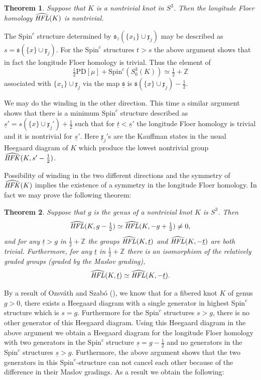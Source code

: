 \documentclass{gtart_h}
\newtheorem{thm}{Theorem}[section]
\theoremstyle{definition}
\newcommand{\ut}{\underline{t}}
\newcommand{\us}{\underline{s}}
\newcommand\relspinc{\underline{\spinc}}
\newcommand{\spinc}{\mathfrak s}
\newcommand\HFK{\text{\it HFK\/}}
\newcommand\HFL{\text{\it HFL\/}}
\newcommand{\Z}{\mathbb{Z}}
\newcommand{\SpinC}{{\mathrm{Spin}}^c}
\begin{document}
\begin{thm}
Suppose that $K$ is a nontrivial  knot in $S^3$. Then the longitude Floer homology $\widehat{\HFL}(K)$
is nontrivial.\end{thm}


The $\SpinC$ structure determined by $\spinc_z(\{x_1\}\cup \mathfrak{x}_j)$ may be described
as $s=\spinc(\{x\}\cup \mathfrak{x}_j)$. For the $\SpinC$ structures $t>s$ the above
argument shows that in fact the longitude Floer homology is trivial.
Thus the element of
$$\tfrac{1}{2}\text{PD}[\mu]+\SpinC(S^3_0(K))\simeq \tfrac{1}{2}+\Z$$
associated with $\{x_1\}\cup \mathfrak{x}_j$ via the map
$\relspinc$ is $\spinc(\{x\}\cup\mathfrak{x}_j)-\frac{1}{2}$.

We may do the winding in the other direction. This time a similar argument shows
that there is a minimum $\SpinC$ structure described as $\us'=s(\{x\}\cup\mathfrak{x}_j')+\frac{1}{2}$
such that for $\ut<\us'$ the longitude Floer homology is trivial and it is nontrivial
for $\us'$. Here $\mathfrak{x}_j'$s are the Kauffman states in the usual Heegaard
diagram of $K$ which produce the lowest nontrivial group $\widehat{\HFK}(K,s'-\frac{1}{2})$.

Possibility of winding in the two different directions and the symmetry of
$\widehat{\HFK}(K)$ implies the
existence of a symmetry in the
longitude Floer homology. In fact we may prove the following theorem:

\begin{thm}\label{thm:genusbound} Suppose that $g$ is the genus of a nontrivial knot $K$ is $S^3$. Then
$$
\widehat{\HFL}(K,g-\tfrac{1}{2})\simeq \widehat{\HFL}(K,-g+\tfrac{1}{2})\neq 0,$$
and for any $\ut>g$ in $\tfrac{1}{2}+\mathbb{Z}$ the groups
$\widehat{\HFL}(K,\ut)$ and $\widehat{\HFL}(K,-\ut)$ are both trivial. Furthermore,
for any $\ut$ in $\tfrac{1}{2}+\mathbb{Z}$ there is an isomorphism of the
relatively graded groups (graded by the Maslov grading),
$$
\widehat{\HFL}(K,\ut)\simeq \widehat{\HFL}(K,-\ut).
$$\end{thm}

By a result of Ozsv\'ath and Szab\'o (\cite{OS-fibered}), we know that for a fibered knot $K$ of genus $g>0$,
there exists a Heegaard diagram with a single generator in highest $\SpinC$ structure which is $s=g$.
Furthermore for the $\SpinC$ structures $s>g$, there is no other generator of this Heegaard diagram.
Using this Heegaard diagram in the above argument we obtain a Heegaard diagram for the longitude Floer homology
with two generators in the $\SpinC$ structure $\us=g-\frac{1}{2}$ and no generators in the $\SpinC$ structures
$\us>g$. Furthermore, the above argument shows that the two generators
in this $\SpinC$-structure can not cancel each other because of the
difference in their Maslov gradings. As a result we obtain the following:
\end{document}
